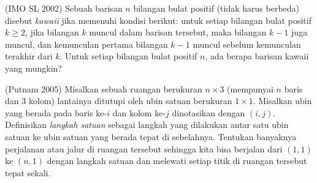 \documentclass[12pt]{scrartcl}
\begin{document}
\begin{soaljawab}
    (IMO SL 2002) Sebuah barisan $n$ bilangan bulat positif (tidak harus berbeda) disebut \textit{kawaii} jika memenuhi kondisi berikut: untuk setiap bilangan bulat positif $k \ge 2$, jika bilangan $k$ muncul dalam barisan tersebut, maka bilangan $k-1$ juga muncul, dan kemunculan pertama bilangan $k-1$ muncul sebelum kemunculan terakhir dari $k$. Untuk setiap bilangan bulat positif $n$, ada berapa barisan kawaii yang mungkin?
\end{soaljawab}

\begin{soaljawab}
    (Putnam 2005) Misalkan sebuah ruangan berukuran $n \times 3$ (mempunyai $n$ baris dan $3$ kolom) lantainya ditutupi oleh ubin satuan berukuran $1 \times 1$. Misalkan ubin yang berada pada baris ke-$i$ dan kolom ke-$j$ dinotasikan dengan $(i,j)$. Definisikan \textit{langkah satuan} sebagai langkah yang dilakukan antar satu ubin satuan ke ubin satuan yang berada tepat di sebelahnya. Tentukan banyaknya perjalanan atau jalur di ruangan tersebut sehingga kita bisa berjalan dari $(1,1)$ ke $(n,1)$ dengan langkah satuan dan melewati setiap titik di ruangan tersebut tepat sekali.
\end{soaljawab}
\end{document}
